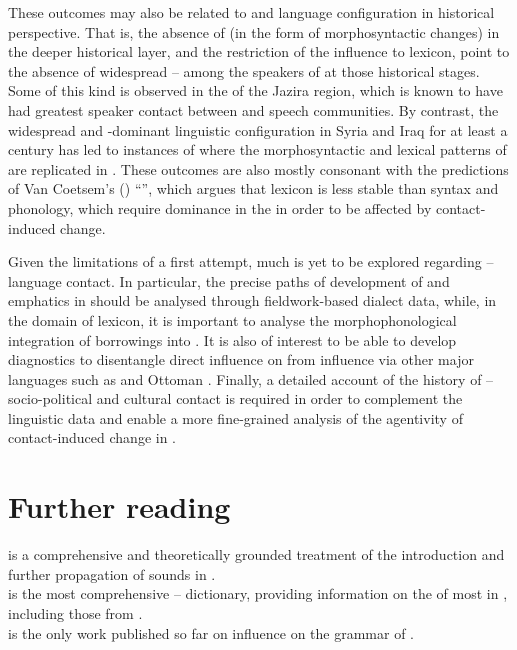 \documentclass[output=paper]{langsci/langscibook}
\begin{document}
These outcomes may also be related to  and language configuration in historical perspective. That is, the absence of  (in the form of morphosyntactic changes) in the deeper historical layer, and the restriction of the influence to lexicon, point to the absence of widespread –  among the speakers of  at those historical stages. Some  of this kind is observed in the  of the Jazira region, which is known to have had greatest speaker contact between  and  speech communities. By contrast, the widespread  and -dominant linguistic configuration in Syria and Iraq for at least a century has led to instances of  where the morphosyntactic and lexical patterns of  are replicated in . These outcomes are also mostly consonant with the predictions of Van Coetsem’s (\citeyear{VanCoetsem1988,VanCoetsem2000}) “”, which argues that lexicon is less stable than syntax and phonology, which require dominance in the  in order to be affected by contact-induced change.    

Given the limitations of a first attempt, much is yet to be explored regarding – language contact. In particular, the precise paths of development of  and emphatics in  should be analysed through fieldwork-based  dialect data, while, in the domain of lexicon, it is important to analyse the morphophonological integration of borrowings into . It is also of interest to be able to develop diagnostics to disentangle direct  influence on  from influence via other major languages such as  and Ottoman . Finally, a detailed account of the history of – socio-political and cultural contact is required in order to complement the linguistic data and enable a more fine-grained analysis of the agentivity of contact-induced change in .      

\section*{Further reading}
\citet{Barryforthcoming} is a comprehensive and theoretically grounded treatment of the introduction and further propagation of  sounds in .\\ 
\citet{Chyet2003} is the most comprehensive – dictionary,  providing information on the  of most  in , including those from .\\
\citet{Tsabolov1994} is the only work published so far on  influence on the grammar of . 
\end{document}
